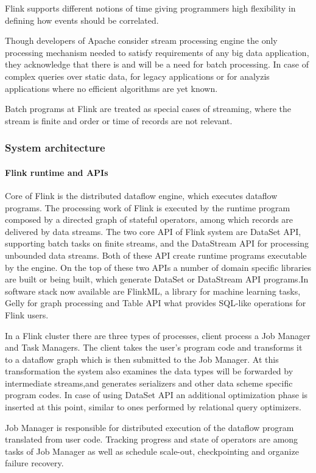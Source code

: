 Flink supports different notions of time giving programmers high flexibility in defining how events should be correlated.

Though developers of Apache consider stream processing engine the only processing mechanism needed to satisfy requirements of any big data application, they acknowledge that there is and will be a need for batch processing. In case of complex queries over static data, for legacy applications or for analyzis applications where no efficient  algorithms  are yet known.

Batch programs at Flink are treated as special cases of streaming, where the stream is finite and order or time of records are not relevant.
\subsubsection{System architecture} 
\paragraph{Flink runtime and APIs}
Core of Flink is the distributed dataflow engine, which executes dataflow programs. The processing work of Flink is executed by the runtime program composed by a directed graph of stateful operators, among which records are delivered by data streams. The two core API of Flink system are DataSet API, supporting batch tasks on finite streams, and the DataStream API  for processing unbounded data streams. Both of these API create runtime programs executable by the engine.
On the top of these two APIs a number of domain specific libraries are built or being built, which generate DataSet or DataStream  API programs.In software stack now available are FlinkML, a library for machine learning tasks, Gelly for graph processing and Table API what provides SQL-like operations for Flink users.

In a Flink cluster there are three types of processes, client process a Job Manager and Task Managers. The client takes the user's program code and transforms it to a dataflow graph which is then submitted to the Job Manager. At this transformation the system also examines the data types will be forwarded by intermediate streams,and generates serializers and other data scheme specific program codes. In case of using DataSet API an additional optimization phase is inserted at this point, similar to ones performed by relational query optimizers.

Job Manager is responsible for distributed execution of the dataflow program translated from user code. Tracking progress and state of operators are among tasks of Job Manager as well as schedule scale-out, checkpointing and organize failure recovery.

